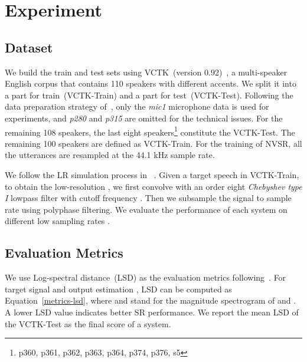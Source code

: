 \documentclass[a4paper]{article}
\def\Eqref#1{Equation~\ref{#1}}
\begin{document}
\section{Experiment}
\label{sec:experiment}
\subsection{Dataset}
We build the train and test sets using VCTK~(version 0.92)~\cite{vctk-yamagishi2019cstr}, a multi-speaker English corpus that contains \num{110} speakers with different accents. We split it into a part for train~(VCTK-Train) and a part for test~(VCTK-Test). Following the data preparation strategy of~\cite{nu-wave-lee2021nu}, only the \textit{mic1} microphone data is used for experiments, and \textit{p280} and \textit{p315} are omitted for the technical issues. For the remaining 108 speakers, the last eight speakers\footnote{p360, p361, p362, p363, p364, p374, p376, s5} constitute the VCTK-Test. The remaining \num{100} speakers are defined as VCTK-Train. For the training of NVSR, all the utterances are resampled at the \num{44.1} kHz sample rate. 

We follow the LR simulation process in ~\cite{audio-supre-resolution-SR-kuleshov2017audio,heming-towards-sr-wang2021towards}.
Given a target speech  in VCTK-Train, to obtain the low-resolution , we first convolve  with an order eight \textit{Chebyshev type I} lowpass filter with cutoff frequency . Then we subsample the signal to  sample rate using polyphase filtering. We evaluate the performance of each system on different low sampling rates .

\subsection{Evaluation Metrics}

We use Log-spectral distance~(LSD) as the evaluation metrics following~\cite{heming-towards-sr-wang2021towards, nu-wave-lee2021nu, nu-gan-kumar2020nu}. For target signal  and output estimation , LSD can be computed as \Eqref{metrics-lsd}, where  and  stand for the magnitude spectrogram of  and . A lower LSD value indicates better SR performance. We report the mean LSD of the VCTK-Test as the final score of a system. 
\end{document}
